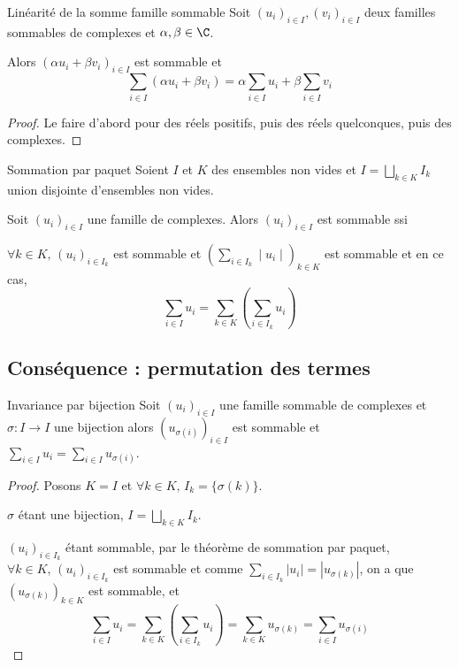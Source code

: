 \begin{proposition}{Linéarité de la somme famille sommable}{}
    Soit $(u_i)_{i \in I}, (v_i)_{i \in I}$ deux familles sommables de complexes et $\alpha, \beta \in \C$.

    Alors $(\alpha u_i + \beta v_i)_{i \in I}$ est sommable et
    $$\sum_{i \in I} (\alpha u_i + \beta v_i) = \alpha \sum_{i \in I} u_i + \beta \sum_{i \in I} v_i$$
\end{proposition}

\begin{proof}
    Le faire d'abord pour des réels positifs, puis des réels quelconques, puis des complexes.
\end{proof}

\begin{theoreme}{Sommation par paquet}{}
    Soient $I$ et $K$ des ensembles non vides et $\displaystyle I = \bigsqcup_{k \in K} I_k$ union
    disjointe d'ensembles non vides.

    Soit $(u_i)_{i \in I}$ une famille de complexes. Alors $(u_i)_{i \in I}$ est sommable ssi
    
    $\forall k \in K, \, (u_i)_{i \in I_k}$ est sommable et $\displaystyle \left( \sum_{i \in I_k} \mid u_i \mid \right)_{k \in K}$ est sommable
    et en ce cas, 
    $$ \sum_{i \in I} u_i = \sum_{k \in K} \left( \sum_{i \in I_k} u_i \right)$$
\end{theoreme}

\subsection{Conséquence : permutation des termes}

\begin{theoreme}{Invariance par bijection}{}
    Soit $(u_i)_{i \in I}$ une famille sommable de complexes et $\sigma: I \to I$ une bijection 
    alors $(u_{\sigma(i)})_{i \in I}$ est sommable et $\displaystyle \sum_{i \in I} u_i = \sum_{i \in I} u_{\sigma(i)}$.
\end{theoreme}

\begin{proof}
    Posons $K = I$ et $\forall k \in K, \, I_k = \{\sigma(k)\}$.

    $\sigma$ étant une bijection, $\displaystyle I = \bigsqcup_{k \in K} I_k$.

    $(u_i)_{i \in I_k}$ étant sommable, par le théorème de sommation par paquet, 
    $\forall k \in K, \, (u_i)_{i \in I_k}$ est sommable 
    et comme $\displaystyle \sum_{i \in I_k} |u_i| = |u_{\sigma(k)}|$,
    on a que $(u_{\sigma(k)})_{k \in K}$ est sommable, et 
    $$\sum_{i \in I} u_i = \sum_{k \in K} \left( \sum_{i \in I_k} u_i \right) = \sum_{k \in K} u_{\sigma(k)} = \sum_{i \in I} u_{\sigma(i)}$$
\end{proof}

